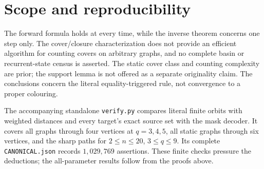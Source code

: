 \section{Scope and reproducibility}
The forward formula holds at every time, while the inverse theorem concerns
one step only. The cover/closure characterization does not provide an
efficient algorithm for counting covers on arbitrary graphs, and no complete
basin or recurrent-state census is asserted. The static cover class and
counting complexity are prior; the support lemma is not offered as a
separate originality claim. The conclusions concern the literal
equality-triggered rule, not convergence to a proper colouring.

The accompanying standalone \texttt{verify.py} compares literal finite
orbits with weighted distances and every target's exact source set with
the mask decoder. It covers all graphs through four vertices at
$q=3,4,5$, all static graphs through six vertices, and the sharp paths for
$2\le n\le20$, $3\le q\le9$. Its complete \texttt{CANONICAL.json} records
$1{,}029{,}769$ assertions. These finite checks pressure the deductions;
the all-parameter results follow from the proofs above.

